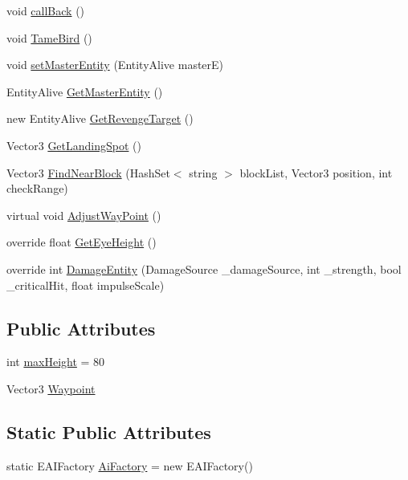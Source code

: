 \begin{DoxyCompactItemize}
\item 
void \mbox{\hyperlink{class_entity_zombie_flying_s_d_x_a096241fb7b8304cf72adf4d65335b4d5}{call\+Back}} ()
\item 
void \mbox{\hyperlink{class_entity_zombie_flying_s_d_x_ab5f6cc5c4f27c468096e5f2ac082f606}{Tame\+Bird}} ()
\item 
void \mbox{\hyperlink{class_entity_zombie_flying_s_d_x_a2b3ea4b934e510141cdcab2986a024c0}{set\+Master\+Entity}} (Entity\+Alive masterE)
\item 
Entity\+Alive \mbox{\hyperlink{class_entity_zombie_flying_s_d_x_a9e38e779f52882038b18ba6411ade1af}{Get\+Master\+Entity}} ()
\item 
new Entity\+Alive \mbox{\hyperlink{class_entity_zombie_flying_s_d_x_ac68332812dcc95c878b586c5c5e01ccf}{Get\+Revenge\+Target}} ()
\item 
Vector3 \mbox{\hyperlink{class_entity_zombie_flying_s_d_x_ac917ce92f0b0dba7de0a69fb08d3dc2d}{Get\+Landing\+Spot}} ()
\item 
Vector3 \mbox{\hyperlink{class_entity_zombie_flying_s_d_x_abc60393e4edf3774fd578ea9ffd44fbe}{Find\+Near\+Block}} (Hash\+Set$<$ string $>$ block\+List, Vector3 position, int check\+Range)
\item 
virtual void \mbox{\hyperlink{class_entity_zombie_flying_s_d_x_a51bebc522872f4939ff7e2a6ae43a0b6}{Adjust\+Way\+Point}} ()
\item 
override float \mbox{\hyperlink{class_entity_zombie_flying_s_d_x_a947821e6f45d591ca5e5bda52b58ff48}{Get\+Eye\+Height}} ()
\item 
override int \mbox{\hyperlink{class_entity_zombie_flying_s_d_x_a40a1f0533c03645cee4416310bd32c2a}{Damage\+Entity}} (Damage\+Source \+\_\+damage\+Source, int \+\_\+strength, bool \+\_\+critical\+Hit, float impulse\+Scale)
\end{DoxyCompactItemize}
\subsection*{Public Attributes}
\begin{DoxyCompactItemize}
\item 
int \mbox{\hyperlink{class_entity_zombie_flying_s_d_x_a50fb6a430711859830cce96d5f26ec90}{max\+Height}} = 80
\item 
Vector3 \mbox{\hyperlink{class_entity_zombie_flying_s_d_x_a0156e326cea7efd4dbf5b0dd7a0f0daf}{Waypoint}}
\end{DoxyCompactItemize}
\subsection*{Static Public Attributes}
\begin{DoxyCompactItemize}
\item 
static E\+A\+I\+Factory \mbox{\hyperlink{class_entity_zombie_flying_s_d_x_a8ae18dc9f20b77748ada6e7b98affcd2}{Ai\+Factory}} = new E\+A\+I\+Factory()
\end{DoxyCompactItemize}
